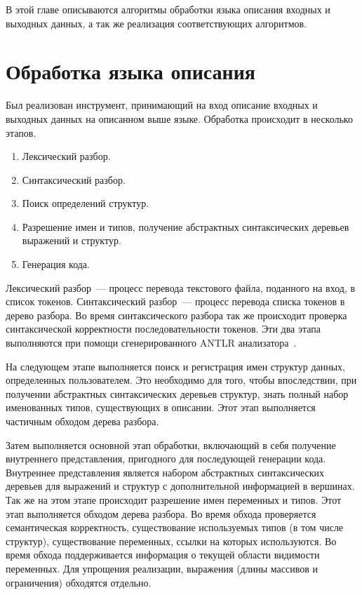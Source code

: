 \documentclass[times,specification,annotation]{style/itmo-student-thesis/itmo-student-thesis}
\begin{document}
В этой главе описываются алгоритмы обработки языка описания входных и выходных данных, а так же реализация соответствующих алгоритмов.

\section{Обработка языка описания}

Был реализован инструмент, принимающий на вход описание входных и выходных данных на описанном выше языке. Обработка происходит в несколько этапов.

\begin{enumerate}[leftmargin=1.75cm]
    \item Лексический разбор.
    \item Синтаксический разбор.
    \item Поиск определений структур.
    \item Разрешение имен и типов, получение абстрактных синтаксических деревьев выражений и структур.
    \item Генерация кода.
\end{enumerate}

Лексический разбор~--- процесс перевода текстового файла, поданного на вход, в список токенов. Синтаксический разбор~--- процесс перевода списка токенов в дерево разбора. Во время синтаксического разбора так же происходит проверка синтаксической корректности последовательности токенов. Эти два этапа выполняются при помощи сгенерированного ANTLR анализатора~\cite{parr2013definitive}.

На следующем этапе выполняется поиск и регистрация имен структур данных, определенных пользователем. Это необходимо для того, чтобы впоследствии, при получении абстрактных синтаксических деревьев структур, знать полный набор именованных типов, существующих в описании. Этот этап выполняется частичным обходом дерева разбора.

Затем выполняется основной этап обработки, включающий в себя получение внутреннего представления, пригодного для последующей генерации кода. Внутреннее представления является набором абстрактных синтаксических деревьев для выражений и структур с дополнительной информацией в вершинах. Так же на этом этапе происходит разрешение имен переменных и типов. Этот этап выполняется обходом дерева разбора. Во время обхода проверяется семантическая корректность, существование используемых типов (в том числе структур), существование переменных, ссылки на которых используются. Во время обхода поддерживается информация о текущей области видимости переменных. Для упрощения реализации, выражения (длины массивов и ограничения) обходятся отдельно.
\end{document}
